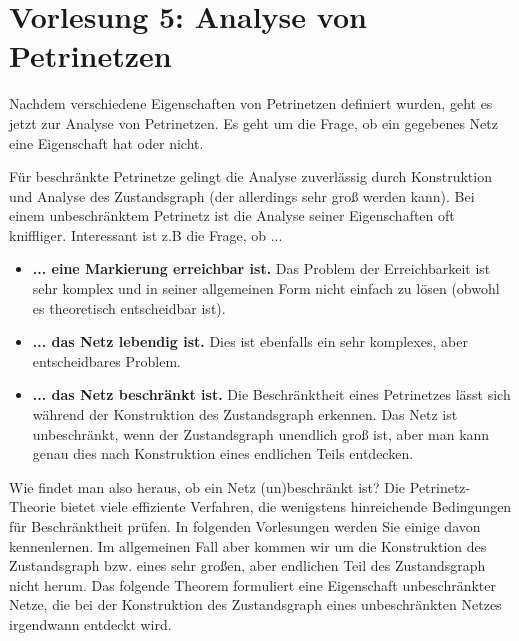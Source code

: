 \section{Vorlesung 5: Analyse von Petrinetzen}

Nachdem verschiedene Eigenschaften von Petrinetzen definiert wurden, geht es jetzt zur Analyse von Petrinetzen. Es geht um die Frage, ob ein gegebenes Netz eine Eigenschaft hat oder nicht.

Für beschränkte Petrinetze gelingt die Analyse zuverlässig 
durch Konstruktion und Analyse des Zustandsgraph (der allerdings sehr groß werden kann). 
Bei einem unbeschränktem Petrinetz ist die Analyse seiner Eigenschaften oft kniffliger. Interessant ist z.B die Frage, ob ...
\begin{itemize}
	\item \textbf{... eine Markierung erreichbar ist.} Das Problem der Erreichbarkeit ist sehr komplex und in seiner allgemeinen Form nicht einfach zu lösen (obwohl es theoretisch entscheidbar ist).
	\item \textbf{... das Netz lebendig ist.} Dies ist ebenfalls ein sehr komplexes, aber entscheidbares Problem.
	\item \textbf{... das Netz beschränkt ist.} 
	Die Beschränktheit eines Petrinetzes lässt sich während der Konstruktion des Zustandsgraph erkennen. Das Netz ist unbeschränkt, wenn der Zustandsgraph unendlich groß ist, aber man kann genau dies nach Konstruktion eines endlichen Teils entdecken.
\end{itemize}

Wie findet man also heraus, ob ein Netz (un)beschränkt ist? Die Petrinetz-Theorie bietet viele effiziente Verfahren, die wenigstens hinreichende Bedingungen für Beschränktheit prüfen. In folgenden Vorlesungen werden Sie einige davon kennenlernen. Im allgemeinen Fall aber kommen wir um die Konstruktion des Zustandsgraph bzw. eines sehr großen, aber endlichen Teil des Zustandsgraph nicht herum. Das folgende Theorem formuliert eine Eigenschaft unbeschränkter Netze, die bei der Konstruktion des Zustandsgraph eines unbeschränkten Netzes irgendwann entdeckt wird.



